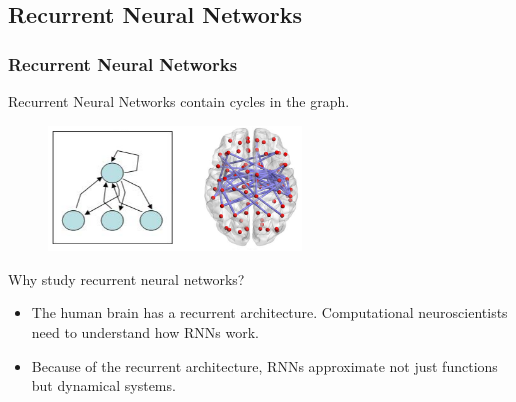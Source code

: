 \documentclass{beamer}
\begin{document}

\subsection{Recurrent Neural Networks}

\begin{frame}
\frametitle{Recurrent Neural Networks}
\begin{center}
Recurrent Neural Networks contain cycles in the graph.
\begin{figure}[!htbp]
\centering
\includegraphics[width=0.6\textwidth]{pictures/rnn_brain.png}
\label{fig:rnn}
\end{figure}
\end{center}

\begin{block}{Why study recurrent neural networks?}

\begin{itemize}
\item The human brain has a recurrent architecture. Computational neuroscientists need to understand how RNNs work.
\item Because of the recurrent architecture, RNNs approximate not just functions but dynamical systems.
\end{itemize}

\end{block}

\end{frame}

\end{document}
